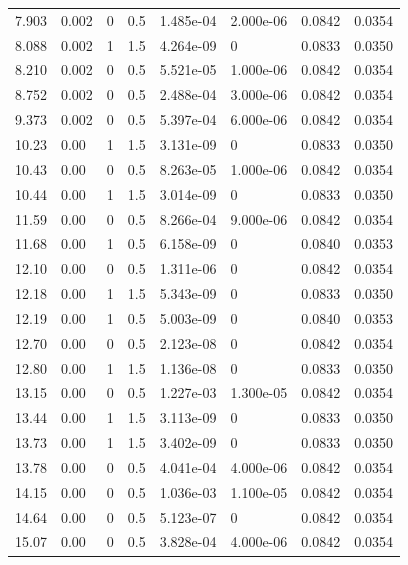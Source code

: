\documentclass[preview]{standalone}
\begin{document}
{{\begin{tabular}{L{1.2cm}C{1.2cm} C{0.3cm}C{0.5cm} C{1.4cm}C{1.4cm} C{1.4cm}C{1.4cm}}
  7.903  &  0.002  & 0     & 0.5 &  1.485e-04  & 2.000e-06  & 0.0842 &  0.0354   \\ 
  8.088  &  0.002  & 1     & 1.5 &  4.264e-09  & 0  & 0.0833 &  0.0350   \\ 
  8.210  &  0.002  & 0     & 0.5 &  5.521e-05  & 1.000e-06  & 0.0842 &  0.0354   \\ 
  8.752  &  0.002  & 0     & 0.5 &  2.488e-04  & 3.000e-06  & 0.0842 &  0.0354   \\ 
  9.373  &  0.002  & 0     & 0.5 &  5.397e-04  & 6.000e-06  & 0.0842 &  0.0354   \\ 
  10.23  &  0.00  & 1     & 1.5 &  3.131e-09  & 0  & 0.0833 &  0.0350   \\ 
  10.43  &  0.00  & 0     & 0.5 &  8.263e-05  & 1.000e-06  & 0.0842 &  0.0354   \\ 
  10.44  &  0.00  & 1     & 1.5 &  3.014e-09  & 0  & 0.0833 &  0.0350   \\ 
  11.59  &  0.00  & 0     & 0.5 &  8.266e-04  & 9.000e-06  & 0.0842 &  0.0354   \\ 
  11.68  &  0.00  & 1     & 0.5 &  6.158e-09  & 0  & 0.0840 &  0.0353   \\ 
  12.10  &  0.00  & 0     & 0.5 &  1.311e-06  & 0  & 0.0842 &  0.0354   \\ 
  12.18  &  0.00  & 1     & 1.5 &  5.343e-09  & 0  & 0.0833 &  0.0350   \\ 
  12.19  &  0.00  & 1     & 0.5 &  5.003e-09  & 0  & 0.0840 &  0.0353   \\ 
  12.70  &  0.00  & 0     & 0.5 &  2.123e-08  & 0  & 0.0842 &  0.0354   \\ 
  12.80  &  0.00  & 1     & 1.5 &  1.136e-08  & 0  & 0.0833 &  0.0350   \\ 
  13.15  &  0.00  & 0     & 0.5 &  1.227e-03  & 1.300e-05  & 0.0842 &  0.0354   \\ 
  13.44  &  0.00  & 1     & 1.5 &  3.113e-09  & 0  & 0.0833 &  0.0350   \\ 
  13.73  &  0.00  & 1     & 1.5 &  3.402e-09  & 0  & 0.0833 &  0.0350   \\ 
  13.78  &  0.00  & 0     & 0.5 &  4.041e-04  & 4.000e-06  & 0.0842 &  0.0354   \\ 
  14.15  &  0.00  & 0     & 0.5 &  1.036e-03  & 1.100e-05  & 0.0842 &  0.0354   \\ 
  14.64  &  0.00  & 0     & 0.5 &  5.123e-07  & 0  & 0.0842 &  0.0354   \\ 
  15.07  &  0.00  & 0     & 0.5 &  3.828e-04  & 4.000e-06  & 0.0842 &  0.0354   \\ 

\end{tabular}}}
\end{document}
